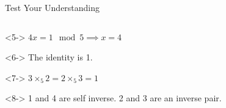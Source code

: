 \documentclass[8pt]{beamer}
\begin{document}
\begin{frame}[shrink=20]{Test Your Understanding}
\begin{columns}[T]
\begin{column}{.5\linewidth}
\begin{solution}<5->
	$4x=1\mod 5 \implies x=4$
\end{solution}
\begin{solution}<6->
	The identity is 1.
\end{solution}
\begin{solution}<7->
	$3\times_5 2=2\times_5 3 =1$
\end{solution}
\begin{solution}<8->
	1 and 4 are self inverse. 2 and 3 are an inverse pair.
\end{solution}
	\end{column}
		\end{columns}

	\end{frame}
\end{document}
